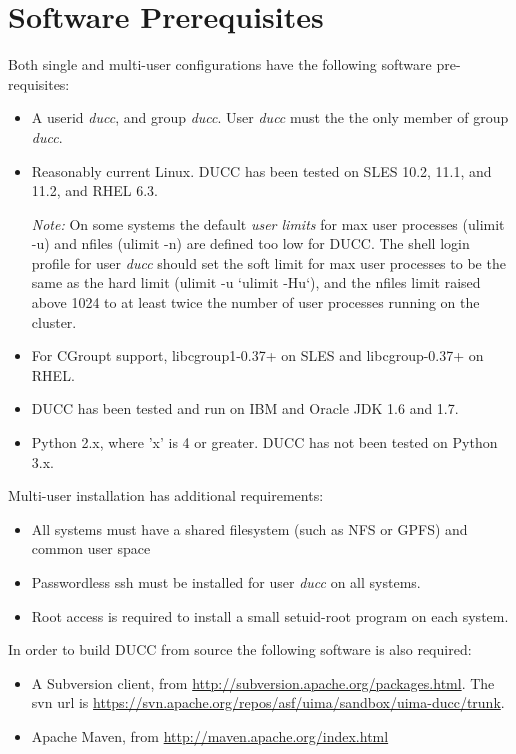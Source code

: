 \section{Software Prerequisites}
\label{sec:install.prerequisites}
Both single and multi-user configurations have the following software pre-requisites:

\begin{itemize}
  \item A userid {\em ducc}, and group {\em ducc}.  User {\em ducc} must the the only member of group {\em ducc}.
  \item Reasonably current Linux.  DUCC has been tested on SLES 10.2, 11.1, and 11.2, and RHEL 6.3.
    
    {\em Note:} On some systems the default {\em user limits}
    for max user processes (ulimit -u) and nfiles (ulimit -n) are defined too
    low for DUCC. The shell login profile for user {\em ducc} should set the
    soft limit for max user processes to be the same as the hard limit
    (ulimit -u `ulimit -Hu`), and
    the nfiles limit raised above 1024 to at least twice the number of user
    processes running on the cluster.

  \item For CGroupt support, libcgroup1-0.37+ on SLES and libcgroup-0.37+ on RHEL.  
  \item DUCC has been tested and run on IBM and Oracle JDK 1.6 and 1.7.
  \item Python 2.x, where 'x' is 4 or greater.  DUCC has not been tested on Python 3.x.
\end{itemize}
  
Multi-user installation has additional requirements:

\begin{itemize}
  \item All systems must have a shared filesystem (such as NFS or GPFS)  and common user space 
  \item Passwordless ssh must be installed for user {\em ducc} on all systems.
  \item Root access is required to install a small setuid-root program on each system.
\end{itemize}
  
In order to build DUCC from source the following software is also required:
\begin{itemize}
    \item A Subversion client, from \url{http://subversion.apache.org/packages.html}.  The
      svn url is \url{https://svn.apache.org/repos/asf/uima/sandbox/uima-ducc/trunk}.
    \item Apache Maven, from \url{http://maven.apache.org/index.html}
\end{itemize}

